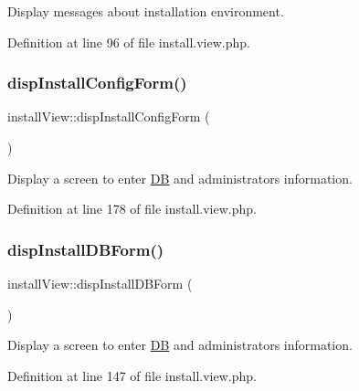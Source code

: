 Display messages about installation environment. 



Definition at line 96 of file install.\+view.\+php.

\hypertarget{classinstallView_ad61c851960b71aad3b93cfd1a23149fb}{}\label{classinstallView_ad61c851960b71aad3b93cfd1a23149fb} 
\subsubsection{\texorpdfstring{disp\+Install\+Config\+Form()}{dispInstallConfigForm()}}
{\footnotesize\ttfamily install\+View\+::disp\+Install\+Config\+Form (\begin{DoxyParamCaption}{ }\end{DoxyParamCaption})}



Display a screen to enter \hyperlink{classDB}{DB} and administrator\textquotesingle{}s information. 



Definition at line 178 of file install.\+view.\+php.

\hypertarget{classinstallView_a61a05991e6aa8bf2278b9c438b70c8c7}{}\label{classinstallView_a61a05991e6aa8bf2278b9c438b70c8c7} 
\subsubsection{\texorpdfstring{disp\+Install\+D\+B\+Form()}{dispInstallDBForm()}}
{\footnotesize\ttfamily install\+View\+::disp\+Install\+D\+B\+Form (\begin{DoxyParamCaption}{ }\end{DoxyParamCaption})}



Display a screen to enter \hyperlink{classDB}{DB} and administrator\textquotesingle{}s information. 



Definition at line 147 of file install.\+view.\+php.

\hypertarget{classinstallView_a811e5c499d36055efb16411c0f0946c1}{}\label{classinstallView_a811e5c499d36055efb16411c0f0946c1} 
